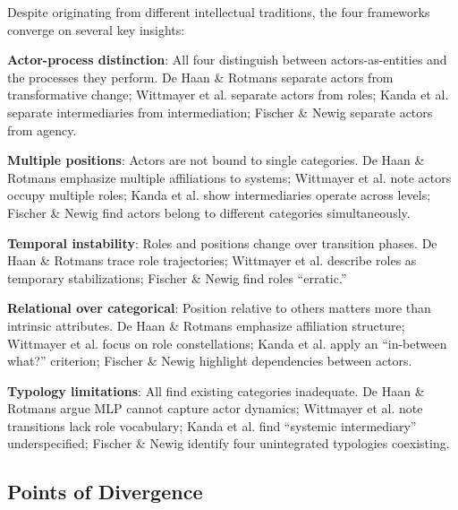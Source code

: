 \documentclass[../main.tex]{subfiles}
\begin{document}
Despite originating from different intellectual traditions, the four frameworks converge on several key insights:

\textbf{Actor-process distinction}: All four distinguish between actors-as-entities and the processes they perform. De Haan \& Rotmans separate actors from transformative change; Wittmayer et al. separate actors from roles; Kanda et al. separate intermediaries from intermediation; Fischer \& Newig separate actors from agency.

\textbf{Multiple positions}: Actors are not bound to single categories. De Haan \& Rotmans emphasize multiple affiliations to systems; Wittmayer et al. note actors occupy multiple roles; Kanda et al. show intermediaries operate across levels; Fischer \& Newig find actors belong to different categories simultaneously.

\textbf{Temporal instability}: Roles and positions change over transition phases. De Haan \& Rotmans trace role trajectories; Wittmayer et al. describe roles as temporary stabilizations; Fischer \& Newig find roles ``erratic.''

\textbf{Relational over categorical}: Position relative to others matters more than intrinsic attributes. De Haan \& Rotmans emphasize affiliation structure; Wittmayer et al. focus on role constellations; Kanda et al. apply an ``in-between what?'' criterion; Fischer \& Newig highlight dependencies between actors.

\textbf{Typology limitations}: All find existing categories inadequate. De Haan \& Rotmans argue MLP cannot capture actor dynamics; Wittmayer et al. note transitions lack role vocabulary; Kanda et al. find ``systemic intermediary'' underspecified; Fischer \& Newig identify four unintegrated typologies coexisting.

\subsection{Points of Divergence}
\end{document}
